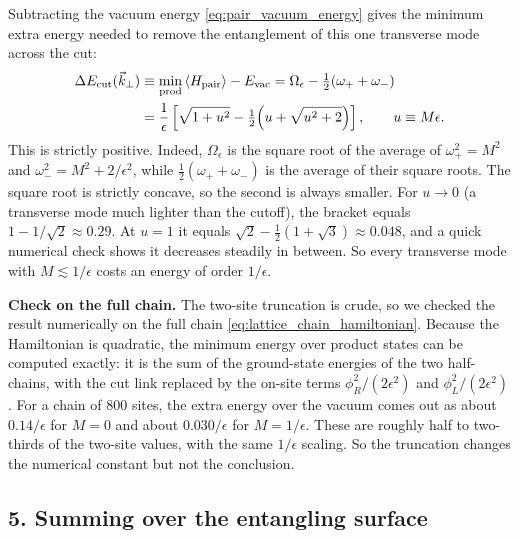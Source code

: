 Subtracting the vacuum energy \eqref{eq:pair_vacuum_energy} gives the minimum extra energy needed to remove
the entanglement of this one transverse mode across the cut:
\begin{align}
\Delta E_{\rm cut}(\vec k_\perp) &\equiv \min_{\rm prod}\braket{H_{\rm pair}} - E_{\rm vac}
= \Omega_\epsilon - \tfrac12(\omega_+ + \omega_-) \notag\\
&= \frac1\epsilon\left[\sqrt{1+u^2} - \tfrac12\Big(u + \sqrt{u^2+2}\Big)\right],
\qquad u \equiv M\epsilon .
\label{eq:delta_e_single_mode}
\end{align}
This is strictly positive. Indeed, $\Omega_\epsilon$ is the square root of the average of $\omega_+^2=M^2$ and
$\omega_-^2=M^2+2/\epsilon^2$, while $\tfrac12(\omega_++\omega_-)$ is the average of their square roots. The
square root is strictly concave, so the second is always smaller. For $u\to0$ (a transverse mode much
lighter than the cutoff), the bracket equals $1-1/\sqrt2\approx0.29$. At $u=1$ it equals
$\sqrt2-\tfrac12(1+\sqrt3)\approx0.048$, and a quick numerical check shows it decreases steadily in between.
So every transverse mode with $M\lesssim1/\epsilon$ costs an energy of order $1/\epsilon$.

\textbf{Check on the full chain.} The two-site truncation is crude, so we checked the result numerically on
the full chain \eqref{eq:lattice_chain_hamiltonian}. Because the Hamiltonian is quadratic, the minimum energy
over product states can be computed exactly: it is the sum of the ground-state energies of the two half-chains,
with the cut link replaced by the on-site terms $\phi_R^2/(2\epsilon^2)$ and $\phi_L^2/(2\epsilon^2)$. For a
chain of 800 sites, the extra energy over the vacuum comes out as about $0.14/\epsilon$ for $M=0$ and
about $0.030/\epsilon$ for $M=1/\epsilon$. These are roughly half to two-thirds of the two-site values, with the same
$1/\epsilon$ scaling. So the truncation changes the numerical constant but not the conclusion.

\subsection*{5. Summing over the entangling surface}

